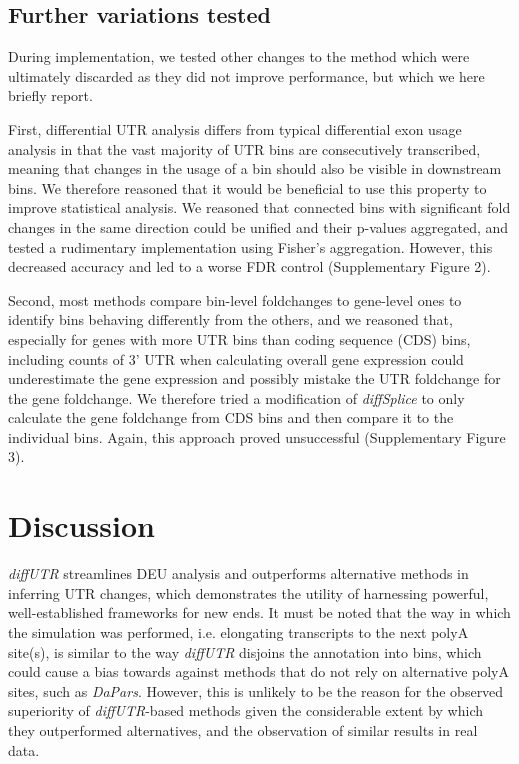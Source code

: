 \documentclass{bmcart}
\begin{document}
\subsection*{Further variations tested}

During implementation, we tested other changes to the method which were ultimately discarded as they did not improve performance, but which we here briefly report.

First, differential UTR analysis differs from typical differential exon usage analysis in that the vast majority of UTR bins are consecutively transcribed, meaning that changes in the usage of a bin should also be visible in downstream bins. We therefore reasoned that it would be beneficial to use this property to improve statistical analysis. We reasoned that connected bins with significant fold changes in the same direction could be unified and their p-values aggregated, and tested a rudimentary implementation using Fisher's aggregation. However, this decreased accuracy and led to a worse FDR control (Supplementary Figure 2).

Second, most methods compare bin-level foldchanges to gene-level ones to identify bins behaving differently from the others, and we reasoned that, especially for genes with more UTR bins than coding sequence (CDS) bins, including counts of 3' UTR when calculating overall gene expression could underestimate the gene expression and possibly mistake the UTR foldchange for the gene foldchange. We therefore tried a modification of \textit{diffSplice} to only calculate the gene foldchange from CDS bins and then compare it to the individual bins. Again, this approach proved unsuccessful (Supplementary Figure 3).

\section*{Discussion}

\textit{diffUTR} streamlines DEU analysis and outperforms alternative methods in inferring UTR changes, which demonstrates the utility of harnessing powerful, well-established frameworks for new ends. It must be noted that the way in which the simulation was performed, i.e. elongating transcripts to the next polyA site(s), is similar to the way \textit{diffUTR} disjoins the annotation into bins, which could cause a bias towards against methods that do not rely on alternative polyA sites, such as \textit{DaPars}. However, this is unlikely to be the reason for the observed superiority of \textit{diffUTR}-based methods given the considerable extent by which they outperformed alternatives, and the observation of similar results in real data.
\end{document}
